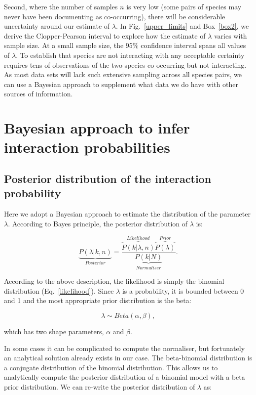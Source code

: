 \documentclass[12pt]{article}
\begin{document}
  Second, where the number of samples $n$ is very low (some pairs of species may never have been documenting as co-occurring), there will be considerable uncertainty around our estimate of $\lambda$. In Fig.~\ref{upper_limits} and Box~\ref{box2}, we derive the Clopper-Pearson interval to explore how the estimate of $\lambda$ varies with sample size. At a small sample size, the 95\% confidence interval spans all values of $\lambda$. To establish that species are not interacting with any acceptable certainty requires tens of observations of the two species co-occurring but not interacting. As most data sets will lack such extensive sampling across all species pairs, we can use a Bayesian approach to supplement what data we do have with other sources of information.


\section*{Bayesian approach to infer interaction probabilities}

    \subsection*{Posterior distribution of the interaction probability}

      Here we adopt a Bayesian approach to estimate the distribution of the parameter $\lambda$. According to Bayes principle, the posterior distribution of $\lambda$ is:

      \begin{equation}
        \underbrace{P(\lambda|k,n)}_{Posterior} = \frac{\overbrace{P(k|\lambda,n)}^{Likelihood}\overbrace{P(\lambda)}^{Prior}}{\underbrace{P(k|N)}_{Normaliser}} .
        \label{posterior}
      \end{equation}

      According to the above description, the likelihood is simply the binomial distribution (Eq.~\ref{likelihood}). Since $\lambda$ is a probability, it is bounded between 0 and 1 and the most appropriate prior distribution is the beta:

      \begin{equation}
        \lambda \sim Beta(\alpha,\beta) , \label{prior}
      \end{equation}

      \noindent which has two shape parameters, $\alpha$ and $\beta$. 

     In some cases it can be complicated to compute the normaliser, but fortunately an analytical solution already exists in our case. The beta-binomial distribution is a conjugate distribution of the binomial distribution. This allows us to analytically compute the posterior distribution of a binomial model with a beta prior distribution. We can re-write the posterior distribution of $\lambda$ as:
\end{document}
